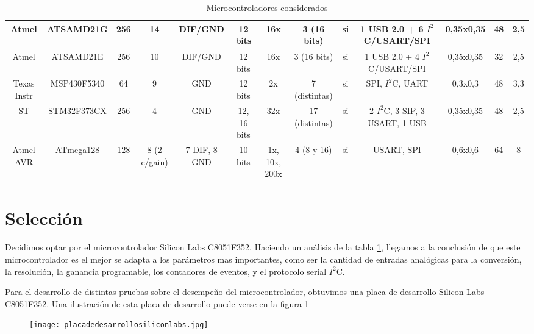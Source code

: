 \begin{landscape}
\begin{table}[!]
\begin{flushleft}
{\begin{tabular}{|c|c|c|c|c|c|c|c|c|c|c|c|c|}
\hline
 Atmel & ATSAMD21G &    256 &     14 & DIF/GND & 12 bits &    16x & 3 (16 bits) &     si & 1 USB 2.0 + 6 $I^{2}$C/USART/SPI & 0,35x0,35 &     48 &    2,5 \\
\hline
 Atmel & ATSAMD21E &    256 &     10 & DIF/GND & 12 bits &    16x & 3 (16 bits) &     si & 1 USB 2.0 + 4 $I^{2}$C/USART/SPI & 0,35x0,35 &     32 &    2,5 \\
\hline
Texas Instr & MSP430F5340 &     64 &      9 &    GND & 12 bits &     2x & 7 (distintas) &     si & SPI, $I^{2}$C, UART & 0,3x0,3 &     48 &    3,3 \\
\hline
    ST & STM32F373CX &    256 &      4 &    GND & 12, 16 bits &    32x & 17 (distintas) &     si & 2 $I^{2}$C, 3 SIP, 3 USART, 1 USB & 0,35x0,35 &     48 &    2,5 \\
\hline
Atmel AVR & ATmega128 &    128 & 8 (2 c/gain) & 7 DIF, 8 GND & 10 bits & 1x, 10x, 200x & 4 (8 y 16) &     si & USART, SPI & 0,6x0,6 &     64 &      8 \\
\hline
\end{tabular}



}
\end{flushleft}
  \caption{Microcontroladores considerados}\label{tabla_micros}
\end{table}

\end{landscape}




\section{Selección} %
\label{it1:sec:seleccion}

Decidimos optar por el microcontrolador Silicon Labs C8051F352. Haciendo un análisis de la tabla \ref{tabla_micros}, llegamos a la conclusión de que este microcontrolador es el mejor se adapta a los parámetros mas importantes, como ser la cantidad de entradas analógicas para la conversión, la resolución, la ganancia programable, los contadores de eventos, y el protocolo serial $I^{2}$C.

Para el desarrollo de distintas pruebas sobre el desempeño del microcontrolador, obtuvimos una placa de desarrollo Silicon Labs C8051F352. Una ilustración de esta placa de desarrollo puede verse en la figura \ref{fig:placadedesarrollosiliconlabs}

\begin{figure}[h]
  \centering
  \texttt{[image: placadedesarrollosiliconlabs.jpg]}
  \caption{}\label{fig:placadedesarrollosiliconlabs}
\end{figure}



